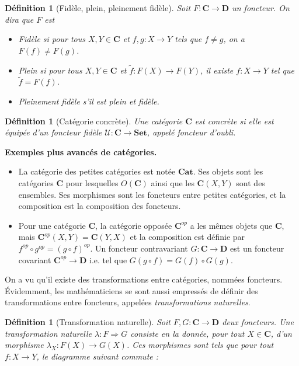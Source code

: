 \documentclass[11pt,a4paper]{report}
\newtheorem{defi}[theo]{Définition}
\newcommand{\itemz}{\item[$\triangleright$]}
\newcommand{\gr}{\textbf}
\newcommand{\il}{\textit}
\newcommand{\U}{\mathcal{U}}
\newcommand{\1}{\mathbbm{1}}
\begin{document}
\begin{defi}[Fidèle, plein, pleinement fidèle]
Soit $F : \gr{C} \to \gr{D}$ un foncteur. On dira que $F$ est
\begin{itemize}
\setlength\itemsep{-0.3em}
\itemz Fidèle si pour tous $X,Y \in \gr{C}$ et $f,g : X \to Y$ tels que $f \neq g$, on a $F(f) \neq F(g)$.
\itemz Plein si pour tous $X,Y \in \gr{C}$ et $\tilde{f} : F(X) \to F(Y)$, il existe $f : X \to Y$ tel que $\tilde{f} = F(f)$.
\itemz Pleinement fidèle s'il est plein et fidèle.
\end{itemize}
\end{defi}
\begin{defi}[Catégorie concrète]
Une catégorie $\gr{C}$ est concrète si elle est équipée d'un foncteur fidèle $\U : \gr{C} \to \gr{Set}$, appelé foncteur d'oubli.
\end{defi}
\gr{Exemples plus avancés de catégories.}
\begin{itemize}
\item La catégorie des petites catégories est notée $\gr{Cat}$. Ses objets sont les catégories $\gr{C}$ pour lesquelles $O(\gr{C})$ ainsi que les $\gr{C}(X,Y)$ sont des ensembles. Ses morphismes sont les foncteurs entre petites catégories, et la composition est la composition des foncteurs.
\item Pour une catégorie $\gr{C}$, la catégorie opposée $\gr{C}^{op}$ a les mêmes objets que $\gr{C}$, mais $\gr{C}^{op}(X,Y) = \gr{C}(Y,X)$ et la composition est définie par $f^{op} \circ g^{op} = (g \circ f)^{op}$. Un foncteur contravariant $G : \gr{C} \to \gr{D}$ est un foncteur covariant $\gr{C}^{op} \to \gr{D}$ i.e. tel que $G(g \circ f) = G(f) \circ G(g)$.
\end{itemize}
On a vu qu'il existe des transformations entre catégories, nommées foncteurs. \'Evidemment, les mathématiciens se sont aussi empressés de définir des transformations entre foncteurs, appelées \il{transformations naturelles}.
\begin{defi}[Transformation naturelle]
Soit $F,G : \gr{C} \to \gr{D}$ deux foncteurs. Une transformation naturelle $\lambda : F \Rightarrow G$ consiste en la donnée, pour tout $X \in \gr{C}$, d'un morphisme $\lambda_X : F(X) \to G(X)$. Ces morphismes sont tels que pour tout $f : X \to Y$, le diagramme suivant commute :
\begin{center}
\end{center}
\end{defi}
\end{document}
